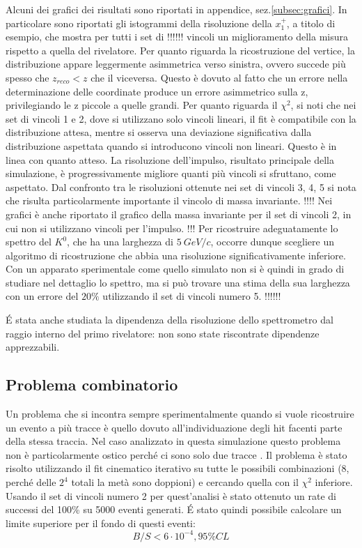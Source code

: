 \documentclass[8pt]{extarticle}
\begin{document}
Alcuni dei grafici dei risultati sono riportati in appendice, sez.\ref{subsec:grafici}. In particolare sono riportati gli istogrammi della risoluzione della $x_1^+$, a titolo di esempio, che mostra per tutti i set di !!!!!! vincoli un miglioramento della misura rispetto a quella del rivelatore. Per quanto riguarda la ricostruzione del vertice, la distribuzione appare leggermente asimmetrica verso sinistra, ovvero succede più spesso che $z_{reco} < z$ che il viceversa. Questo è dovuto al fatto che un errore nella determinazione delle coordinate produce un errore asimmetrico sulla z, privilegiando le z piccole a quelle grandi. Per quanto riguarda il $\chi^2$, si noti che nei set di vincoli 1 e 2, dove si utilizzano solo vincoli lineari, il fit è compatibile con la distribuzione attesa, mentre si osserva una deviazione significativa dalla distribuzione aspettata quando si introducono vincoli non lineari. Questo è in linea con quanto atteso. La risoluzione dell'impulso, risultato principale della simulazione, è progressivamente migliore quanti più vincoli si sfruttano, come aspettato. Dal confronto tra le risoluzioni ottenute nei set di vincoli 3, 4, 5 si nota che risulta particolarmente importante il vincolo di massa invariante. !!!! Nei grafici è anche riportato il grafico della massa invariante per il set di vincoli 2, in cui non si utilizzano vincoli per l'impulso. !!! Per ricostruire adeguatamente lo spettro del $K^0$, che ha una larghezza di $5\ GeV/c$, occorre dunque scegliere un algoritmo di ricostruzione che abbia una risoluzione significativamente inferiore. Con un apparato sperimentale come quello simulato non si è quindi in grado di studiare nel dettaglio lo spettro, ma si può trovare una stima della sua larghezza con un errore del $20\%$ utilizzando il set di vincoli numero 5. !!!!!!

\'E stata anche studiata la dipendenza della risoluzione dello spettrometro dal raggio interno del primo rivelatore: non sono state riscontrate dipendenze apprezzabili. 

\subsection{Problema combinatorio}
Un problema che si incontra sempre sperimentalmente quando si vuole ricostruire un evento a più tracce è quello dovuto all'individuazione degli hit facenti parte della stessa traccia. Nel caso analizzato in questa simulazione questo problema non è particolarmente ostico perché ci sono solo due tracce . Il problema è stato risolto utilizzando il fit cinematico iterativo su tutte le possibili combinazioni (8, perché delle $2^4$ totali la metà sono doppioni) e cercando quella con il $\chi^2$ inferiore. Usando il set di vincoli numero 2 per quest'analisi è stato ottenuto un rate di successi del 100\% su 5000 eventi generati. \'E stato quindi possibile calcolare un limite superiore per il fondo di questi eventi:
$$
B/S < 6\cdot 10^{-4}, 95\% CL
$$
\end{document}
